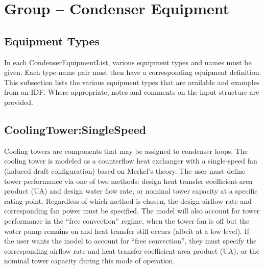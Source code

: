 \section{Group -- Condenser Equipment}\label{group-condenser-equipment}

\subsection{Equipment Types}\label{equipment-types}

In each CondenserEquipmentList, various equipment types and names must be given. Each type-name pair must then have a corresponding equipment definition. This subsection lists the various equipment types that are available and examples from an IDF. Where appropriate, notes and comments on the input structure are provided.

\subsection{CoolingTower:SingleSpeed}\label{coolingtowersinglespeed}

Cooling towers are components that may be assigned to condenser loops. The cooling tower is modeled as a counterflow heat exchanger with a single-speed fan (induced draft configuration) based on Merkel's theory. The user must define tower performance via one of two methods: design heat transfer coefficient-area product (UA) and design water flow rate, or nominal tower capacity at a specific rating point. Regardless of which method is chosen, the design airflow rate and corresponding fan power must be specified. The model will also account for tower performance in the ``free convection'' regime, when the tower fan is off but the water pump remains on and heat transfer still occurs (albeit at a low level). If the user wants the model to account for ``free convection'', they must specify the corresponding airflow rate and heat transfer coefficient-area product (UA), or the nominal tower capacity during this mode of operation.

